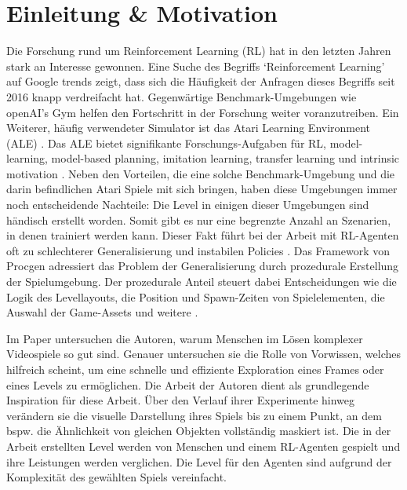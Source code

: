 \section{Einleitung \& Motivation}\label{einleitung}
\pagestyle{fancy}
Die Forschung rund um Reinforcement Learning (RL) hat in den letzten Jahren stark an Interesse gewonnen. Eine Suche des Begriffs ‘Reinforcement Learning’ auf Google trends zeigt, dass sich die Häufigkeit der Anfragen dieses Begriffs seit 2016 knapp verdreifacht hat.
Gegenwärtige Benchmark-Umgebungen wie openAI’s Gym \cite{brockman2016openAI_gym} helfen den Fortschritt in der Forschung weiter voranzutreiben. Ein Weiterer, häufig verwendeter Simulator ist das Atari Learning Environment (ALE) \cite{bellemare2013arcade}. Das ALE bietet signifikante Forschungs-Aufgaben für RL, model-learning, model-based planning, imitation learning, transfer learning und intrinsic motivation \cite{bellemare2013arcade}. Neben den Vorteilen, die eine solche Benchmark-Umgebung und die darin befindlichen Atari Spiele mit sich bringen, haben diese Umgebungen immer noch entscheidende Nachteile: Die Level in einigen dieser Umgebungen sind händisch erstellt worden. Somit gibt es nur eine begrenzte Anzahl an Szenarien, in denen trainiert werden kann. Dieser Fakt führt bei der Arbeit mit RL-Agenten oft zu schlechterer Generalisierung und instabilen Policies \cite{zhang2018natural}.
Das Framework von Procgen adressiert das Problem der Generalisierung durch prozedurale Erstellung der Spielumgebung. Der prozedurale Anteil steuert dabei Entscheidungen wie die Logik des Levellayouts, die Position und Spawn-Zeiten von Spielelementen, die Auswahl der Game-Assets und weitere \cite{cobbe2019procgen}.

Im Paper \cite{dubey2018investigating} untersuchen die Autoren, warum Menschen im Lösen komplexer Videospiele so gut sind. Genauer untersuchen sie die Rolle von Vorwissen, welches hilfreich scheint, um eine schnelle und effiziente Exploration eines Frames oder eines Levels zu ermöglichen. Die Arbeit der Autoren dient als grundlegende Inspiration für diese Arbeit. Über den Verlauf ihrer Experimente hinweg verändern sie die visuelle Darstellung ihres Spiels bis zu einem Punkt, an dem bspw. die Ähnlichkeit von gleichen Objekten vollständig maskiert ist. Die in der Arbeit \cite{dubey2018investigating} erstellten Level werden von Menschen und einem RL-Agenten gespielt und ihre Leistungen werden verglichen. Die Level für den Agenten sind aufgrund der Komplexität des gewählten Spiels vereinfacht.


